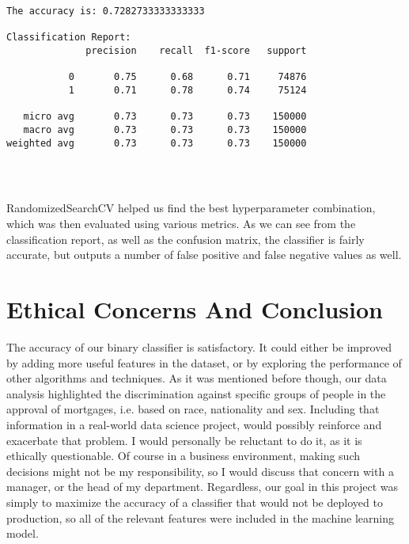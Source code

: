 \documentclass[11pt]{article}
\begin{document}
    \begin{Verbatim}[commandchars=\\\{\}]
The accuracy is: 0.7282733333333333

Classification Report:
              precision    recall  f1-score   support

           0       0.75      0.68      0.71     74876
           1       0.71      0.78      0.74     75124

   micro avg       0.73      0.73      0.73    150000
   macro avg       0.73      0.73      0.73    150000
weighted avg       0.73      0.73      0.73    150000


    \end{Verbatim}

    \begin{center}
    \end{center}
    { \hspace*{\fill} \\}
    
RandomizedSearchCV helped us find the best hyperparameter
combination, which was then evaluated using various metrics.
As we can see from the classification report, as well as the confusion
matrix, the classifier is fairly accurate, but outputs a number of false
positive and false negative values as well.

    \section{Ethical Concerns And
Conclusion}\label{ethical-concerns-and-conclusion}

The accuracy of our binary classifier is satisfactory. It could either
be improved by adding more useful features in the dataset, or by
exploring the performance of other algorithms and techniques. As it was
mentioned before though, our data analysis highlighted the
discrimination against specific groups of people in the approval of
mortgages, i.e. based on race, nationality and sex. Including that
information in a real-world data science project, would possibly
reinforce and exacerbate that problem. I would personally be reluctant
to do it, as it is ethically questionable. Of course in a business
environment, making such decisions might not be my responsibility, so I would discuss
that concern with a manager, or the head of my department. Regardless, our
goal in this project was simply to maximize the accuracy of a
classifier that would not be deployed to production, so all of the relevant
features were included in the machine learning model.


    
    
    
    
\end{document}
